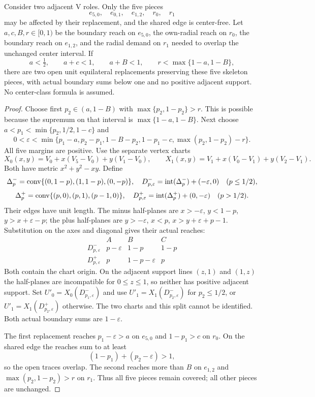 \begin{lemma}
\label{lem:two-vertex-replacement}
Consider two adjacent V roles. Only the five pieces
\[
 e_{5,0},\quad e_{0,1},\quad e_{1,2},\quad r_0,\quad r_1
\]
may be affected by their replacement, and the shared edge is center-free.
Let $a,c,B,r\in[0,1)$ be the boundary reach on $e_{5,0}$, the own-radial
reach on $r_0$, the boundary reach on $e_{1,2}$, and the radial demand
on $r_1$ needed to overlap the unchanged center interval. If
\[
 a<\tfrac12,\qquad a+c<1,\qquad a+B<1,\qquad
 r<\max\{1-a,1-B\},
\]
there are two open unit equilateral replacements preserving these five
skeleton pieces, with actual boundary sums below one and no positive
adjacent support. No center-class formula is assumed.
\end{lemma}
\begin{proof}
Choose first $p_2\in(a,1-B)$ with $\max\{p_2,1-p_2\}>r$. This is
possible because the supremum on that interval is $\max\{1-a,1-B\}$.
Next choose $a<p_1<\min\{p_2,1/2,1-c\}$ and
\[
 0<\varepsilon<\min\{p_1-a,p_2-p_1,1-B-p_2,
                         1-p_1-c,\max(p_2,1-p_2)-r\}.
\]
All five margins are positive. Use the separate vertex charts
\[
 X_0(x,y)=V_0+x(V_5-V_0)+y(V_1-V_0),\qquad
 X_1(x,y)=V_1+x(V_0-V_1)+y(V_2-V_1).
\]
Both have metric $x^2+y^2-xy$. Define
\[
 \Delta_p^-=\mathrm{conv}\{(0,1-p),(1,1-p),(0,-p)\},\quad
 D^-_{p,\varepsilon}=\mathrm{int}(\Delta_p^-)+(-\varepsilon,0)
 \quad(p\le1/2),
\]
\[
 \Delta_p^+=\mathrm{conv}\{(p,0),(p,1),(p-1,0)\},\quad
 D^+_{p,\varepsilon}=\mathrm{int}(\Delta_p^+)+(0,-\varepsilon)
 \quad(p>1/2).
\]
Their edges have unit length. The minus half-planes are
$x>-\varepsilon$, $y<1-p$, $y>x+\varepsilon-p$; the plus half-planes
are $y>-\varepsilon$, $x<p$, $x>y+\varepsilon+p-1$.
Substitution on the axes and diagonal gives their actual reaches:
\[
\begin{array}{c|ccc}
 &A&B&C\\\hline
 D^-_{p,\varepsilon}&p-\varepsilon&1-p&1-p\\
 D^+_{p,\varepsilon}&p&1-p-\varepsilon&p
\end{array}
\]
Both contain the chart origin. On the adjacent support lines $(z,1)$ and
$(1,z)$ the half-planes are incompatible for $0\le z\le1$, so neither
has positive adjacent support.
Set $U'_0=X_0(D^-_{p_1,\varepsilon})$ and use
$U'_1=X_1(D^-_{p_2,\varepsilon})$ for $p_2\le1/2$, or
$U'_1=X_1(D^+_{p_2,\varepsilon})$ otherwise. The two charts and this
split cannot be identified. Both actual boundary sums are $1-\varepsilon$.

The first replacement reaches $p_1-\varepsilon>a$ on $e_{5,0}$ and
$1-p_1>c$ on $r_0$. On the shared edge the reaches sum to at least
\[
 (1-p_1)+(p_2-\varepsilon)>1,
\]
so the open traces overlap. The second reaches more than $B$ on
$e_{1,2}$ and $\max(p_2,1-p_2)>r$ on $r_1$. Thus all five pieces
remain covered; all other pieces are unchanged.
\end{proof}

